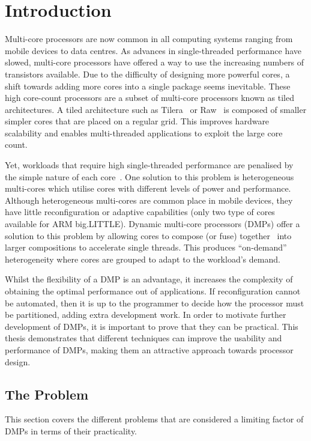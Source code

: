 \chapter{Introduction}
\vspace{-1em}
Multi-core processors are now common in all computing systems ranging from mobile devices to data centres.
As advances in single-threaded performance have slowed, multi-core processors have offered a way to use the increasing numbers of transistors available.
Due to the difficulty of designing more powerful cores, a shift towards adding more cores into a single package seems inevitable.
These high core-count processors are a subset of multi-core processors known as tiled architectures.
A tiled architecture such as Tilera~\cite{bell2008tile} or Raw~\cite{waingold1997raw} is composed of smaller simpler cores that are placed on a regular grid.
This improves hardware scalability and enables multi-threaded applications to exploit the large core count.

Yet, workloads that require high single-threaded performance are penalised by the simple nature of each core~\cite{eyerman2010amdahl}.
One solution to this problem is heterogeneous multi-cores which utilise cores with different levels of power and performance.
Although heterogeneous multi-cores are common place in mobile devices, they have little reconfiguration or adaptive capabilities (\eg only two type of cores available for ARM big.LITTLE).
Dynamic multi-core processors (DMPs) offer a solution to this problem by allowing cores to compose (or fuse) together~\cite{ipek2007CoreFusion} into larger compositions to accelerate single threads.
This produces ``on-demand'' heterogeneity where cores are grouped to adapt to the workload's demand.

Whilst the flexibility of a DMP is an advantage, it increases the complexity of obtaining the optimal performance out of applications.
If reconfiguration cannot be automated, then it is up to the programmer to decide how the processor must be partitioned, adding extra development work.
In order to motivate further development of DMPs, it is important to prove that they can be practical.
This thesis demonstrates that different techniques can improve the usability and performance of DMPs, making them an attractive approach towards processor design. 

\section{The Problem}
This section covers the different problems that are considered a limiting factor of DMPs in terms of their practicality.
